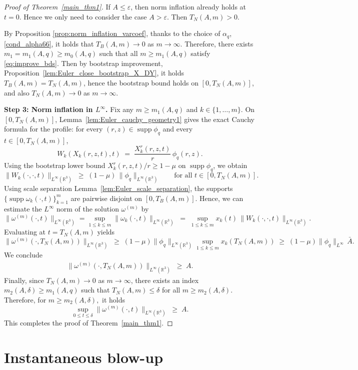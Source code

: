 \documentclass[reqno,11pt]{amsart}
\newcommand{\supp}{\operatorname{supp}}
\begin{document}
\begin{proof}[Proof of Theorem~\ref{main_thm1}]
If $A\leq \varepsilon$, then norm inflation already holds at $t=0$. Hence we only need to consider the case $A> \varepsilon$. Then $T_N(A,m)>0$. 


By Proposition \ref{prop:norm_inflation_varcoef},  thanks to the choice of $\alpha_q$, \eqref{cond_alpha66}, it holds that $T_B(A,m)\to 0$  as $m\to\infty$.
Therefore, there exists $m_1=m_1(A,q)\geq m_0(A,q)$ such that all $m\geq m_1(A,q)$ satisfy \eqref{eq:improve_bds}.
Then by bootstrap improvement, Proposition~\ref{lem:Euler_close_bootstrap_X_DY}, it holds $T_B(A,m)=T_N(A,m)$, hence the bootstrap bound holds on $[0,T_N(A, m)]$, and also $T_N(A,m)\to 0$ as $m\to\infty$.

\medskip
\noindent
\textbf{Step 3: Norm inflation in $L^\infty$.}
Fix any $m\geq m_1(A,q)$ and $k\in\{1,\dots,m\}$.
On $[0,T_N(A,m)]$, Lemma~\ref{lem:Euler_cauchy_geometry1} gives the exact Cauchy formula for the profile:
for every $(r,z)\in\supp\phi_q$ and every $t\in[0,T_N(A, m)]$,
\[
W_k(X_k(r,z,t),t)\;=\;\frac{X^r_k(r,z,t)}{r}\,\phi_q(r,z).
\]
Using the bootstrap lower bound $X^r_k(r,z,t)/r\ge 1-\mu$ on $\supp\phi_q$, we obtain
\[
\|W_k(\cdot,\cdot,t)\|_{L^\infty(\mathbb{R}^3)}
\;\ge\;(1-\mu)\,\|\phi_q\|_{L^\infty(\mathbb{R}^3)}
\qquad\text{for all }t\in[0,T_N(A,m)].
\]
Using scale separation Lemma~\ref{lem:Euler_scale_separation}, the supports $\{\supp \omega_k(\cdot,t)\}_{k=1}^m$ are pairwise disjoint on $[0,T_B(A,m)]$. Hence, we  can estimate the $L^\infty$ norm of the solution $\omega^{(m)}$ by
\[
\|\omega^{(m)}(\cdot,t)\|_{L^\infty(\mathbb R^3)}
=\sup_{1\leq k\leq m}\|\omega_k(\cdot,t)\|_{L^\infty(\mathbb R^3)}
\;=\; \sup_{1\leq k \leq m} x_k(t)\,\|W_k(\cdot,\cdot,t)\|_{L^\infty(\mathbb{R}^3)}.
\]
Evaluating at $t=T_N(A, m)$ yields
\[
\|\omega^{(m)}(\cdot,T_N(A, m))\|_{L^\infty(\mathbb R^3)}
\;\ge\;(1-\mu)\|\phi_q\|_{L^\infty(\mathbb{R}^3)}
\sup_{1\le k\le m} x_k(T_N(A, m))
\;\geq \;(1-\mu)\|\phi_q\|_{L^\infty}\,\bar A.
\]
We conclude
\begin{align*}
\|\omega^{(m)}(\cdot,T_N(A,m))\|_{L^\infty(\mathbb R^3)}
\;\ge\;A.
\end{align*}
Finally, since $T_N(A,m)\to 0$ as $m\to\infty$, there exists an index $m_2(A,\delta)\geq m_1(A,q)$ such that $T_N(A,m)\le \delta$ for all $m\ge m_2(A,\delta)$. 
Therefore, for $m\geq  m_2(A,\delta),$ it holds 
\[
\sup_{0\le t\le \delta}\|\omega^{(m)}(\cdot,t)\|_{L^\infty(\mathbb R^3)} \;\ge\; A.
\]
This completes the proof of Theorem~\ref{main_thm1}.
\end{proof}


\section{Instantaneous blow-up}
\label{sec:inst_bu}
\end{document}
